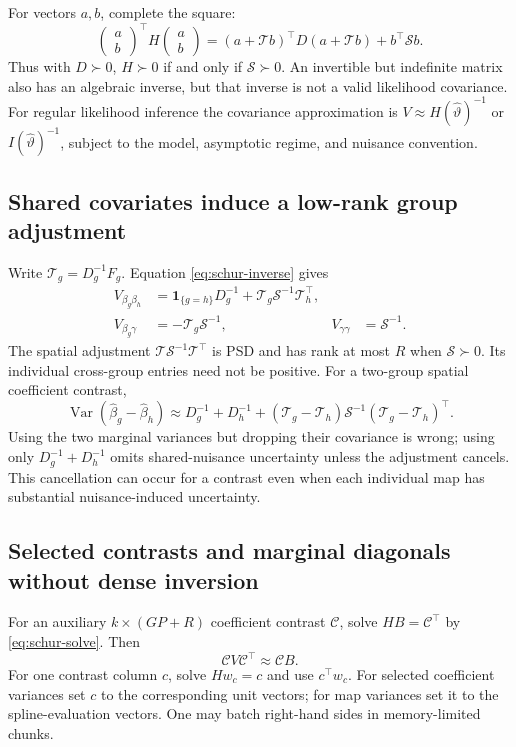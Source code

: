 \documentclass[11pt,a4paper]{article}
\newcommand{\Var}{\operatorname{Var}}
\numberwithin{equation}{section}
\begin{document}
For vectors $a,b$, complete the square:
\begin{equation}
 \begin{pmatrix}a\\b\end{pmatrix}^{\!\top}H
 \begin{pmatrix}a\\b\end{pmatrix}
 =(a+\mathcal T b)^\top D(a+\mathcal T b)+b^\top\mathcal S b.
 \label{eq:complete-square}
\end{equation}
Thus with $D\succ0$, $H\succ0$ if and only if ${\mathcal S}\succ0$.
An invertible but indefinite matrix also has an algebraic inverse,
but that inverse is not a valid likelihood covariance.
For regular likelihood inference the covariance approximation is
$V\approx H(\widehat\vartheta)^{-1}$ or $I(\widehat\vartheta)^{-1}$,
subject to the model, asymptotic regime, and nuisance convention.

\subsection{Shared covariates induce a low-rank group adjustment}
Write $\mathcal T_g=D_g^{-1}F_g$. Equation \eqref{eq:schur-inverse} gives
\begin{align}
 V_{\beta_g\beta_h}
 &=\mathbf1_{\{g=h\}}D_g^{-1}+\mathcal T_g\mathcal S^{-1}\mathcal T_h^\top,\\
 V_{\beta_g\gamma}&=-\mathcal T_g\mathcal S^{-1},&
 V_{\gamma\gamma}&={\mathcal S}^{-1}. \label{eq:cov-blocks}
\end{align}
The spatial adjustment $\mathcal T\mathcal S^{-1}\mathcal T^\top$
is PSD and has rank at most $R$
when ${\mathcal S}\succ0$. Its individual cross-group entries need not be positive.
For a two-group spatial coefficient contrast,
\begin{equation}
 \Var(\widehat\beta_g-\widehat\beta_h)
 \approx D_g^{-1}+D_h^{-1}
       +(\mathcal T_g-\mathcal T_h)\mathcal S^{-1}
        (\mathcal T_g-\mathcal T_h)^\top .
\end{equation}
Using the two marginal variances but dropping their covariance is wrong;
using only $D_g^{-1}+D_h^{-1}$ omits shared-nuisance uncertainty unless
the adjustment cancels. This cancellation can occur for a contrast even
when each individual map has substantial nuisance-induced uncertainty.

\subsection{Selected contrasts and marginal diagonals without dense inversion}
For an auxiliary $k\times(GP+R)$ coefficient contrast $\mathcal C$, solve
$HB=\mathcal C^\top$ by \eqref{eq:schur-solve}. Then
\begin{equation}
 \mathcal C V\mathcal C^\top\approx\mathcal C B.
 \label{eq:selected-solve}
\end{equation}
For one contrast column $c$, solve $Hw_c=c$ and use $c^\top w_c$.
For selected coefficient variances set $c$ to the corresponding unit
vectors; for map variances set it to the spline-evaluation vectors.
One may batch right-hand sides in memory-limited chunks.
\end{document}
